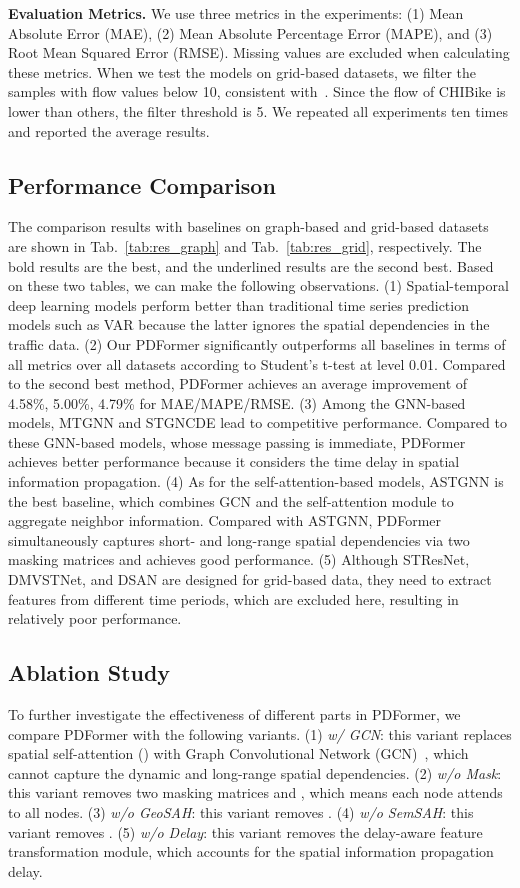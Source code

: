 \documentclass[letterpaper]{article} \usepackage{aaai23}  \usepackage{times}  \usepackage{helvet}  \usepackage{courier}  \usepackage[hyphens]{url}  \usepackage{graphicx} \urlstyle{rm} \def\UrlFont{\rm}  \usepackage{natbib}  \usepackage{caption} \frenchspacing  \setlength{\pdfpagewidth}{8.5in} \setlength{\pdfpageheight}{11in} \usepackage{algorithm}
\newcommand{\name}{PDFormer\xspace}
\newcommand{\paratitle}[1]{\vspace{1.5ex}\noindent\textbf{#1}}
\newcommand{\ssa}{\xspace}
\newcommand{\gsah}{\xspace}
\newcommand{\ssah}{\xspace}
\begin{document}
\paratitle{Evaluation Metrics.} We use three metrics in the experiments: (1) Mean Absolute Error (MAE), (2) Mean Absolute Percentage Error (MAPE), and (3) Root Mean Squared Error (RMSE). Missing values are excluded when calculating these metrics. When we test the models on grid-based datasets, we filter the samples with flow values below 10, consistent with~\cite{dmvstnet}. Since the flow of CHIBike is lower than others, the filter threshold is 5. We repeated all experiments ten times and reported the average results.

\subsection{Performance Comparison}

The comparison results with baselines on graph-based and grid-based datasets are shown in Tab.~\ref{tab:res_graph} and Tab.~\ref{tab:res_grid}, respectively. The bold results are the best, and the underlined results are the second best. Based on these two tables, we can make the following observations. (1) Spatial-temporal deep learning models perform better than traditional time series prediction models such as VAR because the latter ignores the spatial dependencies in the traffic data. (2) Our \name significantly outperforms all baselines in terms of all metrics over all datasets according to Student's t-test at level 0.01. Compared to the second best method, \name achieves an average improvement of 4.58\%, 5.00\%, 4.79\% for MAE/MAPE/RMSE. (3) Among the GNN-based models, MTGNN and STGNCDE lead to competitive performance. Compared to these GNN-based models, whose message passing is immediate, \name achieves better performance because it considers the time delay in spatial information propagation. (4) As for the self-attention-based models, ASTGNN is the best baseline, which combines GCN and the self-attention module to aggregate neighbor information. Compared with ASTGNN, \name simultaneously captures short- and long-range spatial dependencies via two masking matrices and achieves good performance. (5) Although STResNet, DMVSTNet, and DSAN are designed for grid-based data, they need to extract features from different time periods, which are excluded here, resulting in relatively poor performance.

\subsection{Ablation Study}
To further investigate the effectiveness of different parts in \name, we compare \name with the following variants. (1) \textit{w/ GCN}: this variant replaces spatial self-attention (\ssa) with Graph Convolutional Network (GCN)~\cite{gcn}, which cannot capture the dynamic and long-range spatial dependencies. (2) \textit{w/o Mask}: this variant removes two masking matrices  and , which means each node attends to all nodes. (3) \textit{w/o GeoSAH}: this variant removes \gsah. (4) \textit{w/o SemSAH}: this variant removes \ssah. (5) \textit{w/o Delay}: this variant removes the delay-aware feature transformation module, which accounts for the spatial information propagation delay.
\end{document}
